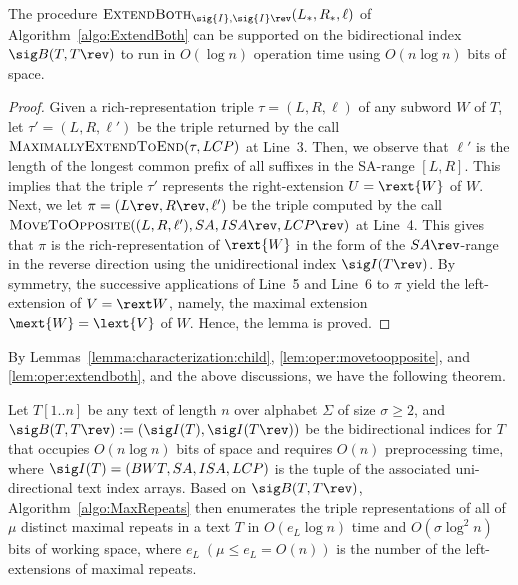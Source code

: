 \begin{lemma}\label{lem:oper:extendboth}
The procedure  $\textsc{ExtendBoth}_{\sig{I},\sig{I}\rev}(L_*,R_*,\ell)$ of Algorithm~\ref{algo:ExtendBoth} 
can be supported on the bidirectional index $\sig B(T, T\rev)$ to run in $O(\log n)$ operation time using $O(n\log n)$ bits of space. 
\end{lemma}

\begin{proof}
Given a rich-representation triple $\tau = (L, R, \ell)$ of any subword $W$ of $T$, let $\tau' = (L, R, \ell')$ be the triple returned by the call $\textsc{MaximallyExtendToEnd}(\tau, LCP)$ at Line~3. Then, we observe that $\ell'$ is the length of the longest common prefix of all suffixes in the SA-range $[L, R]$. This implies that the triple $\tau'$ represents the right-extension $U = \rext{W}$ of $W$. 
Next, we let $\pi = (L\rev,R\rev,\ell')$ be the triple computed by the call $\textsc{MoveToOpposite}((L, R, \ell'), SA, ISA\rev, LCP\rev)$  at Line~4. This gives that $\pi$ is the rich-representation of $\rext{W}$ in the form of the $SA\rev$-range in the reverse direction using the unidirectional index $\sig I(T\rev)$. 
By symmetry, the successive applications of Line~5 and Line~6 to $\pi$ yield the left-extension of $V = \rext W$, namely, the maximal extension $\mext{W} = \lext{V}$ of $W$. Hence, the lemma is proved. 
\end{proof}

By Lemmas~\ref{lemma:characterization:child}, \ref{lem:oper:movetoopposite}, and \ref{lem:oper:extendboth}, and the above discussions, we have the following theorem. 

\begin{theorem}
Let $T[1..n]$ be any text of length $n$ over alphabet $\Sigma$ of size $\sigma\ge 2$, and $\sig B(T, T\rev) := (\sig I(T), \sig I(T\rev))$ be the bidirectional indices for $T$ that occupies $O(n\log n)$ bits of space and requires $O(n)$ preprocessing time, where $\sig I(T) = (BWT, SA, ISA, LCP)$ is the tuple of the associated uni-directional text index arrays.
Based on $\sig B(T, T\rev)$, Algorithm~\ref{algo:MaxRepeats} then enumerates  
the triple representations of all of $\mu$ distinct maximal repeats in a text $T$ in  $O(e_L\log n)$ time and $O(\sigma\log^2 n)$ bits of working space, where $e_L \;(\mu \le e_L = O(n))$ is the number of  the left-extensions of maximal repeats. 
\end{theorem}

